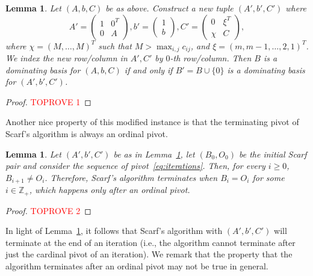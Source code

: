 \documentclass[11pt]{article}
\newtheorem{lemma}[theorem]{Lemma}
\begin{document}
\begin{lemma}\label{lem:0-Row-Column}
Let $(A,b,C)$ be as above. Construct a new tuple $(A',b',C')$ where 
\begin{equation}\label{eq:0-Row-Column}
    A'=\left(\begin{matrix}
        1 & 0^T \\
        0 & A
    \end{matrix}\right),
    b'=\left(\begin{matrix}
        1  \\
        b
    \end{matrix}\right),
    C'=\left(\begin{matrix}
        0 & \xi^T \\
        \chi & C
    \end{matrix}\right),
\end{equation}
where $\chi=(M,\dots,M)^T$ such that $M>\max_{i,j}c_{ij}$, and $\xi=(m,m-1,\dots,2,1)^T$. We index the new row/column in $A',C'$ by $0$-th row/column.
Then $B$ is a dominating basis for $(A,b,C)$ if and only if $B'=B\cup\{0\}$ is a dominating basis for $(A',b',C')$. 

\end{lemma}

\begin{proof}\textcolor{red}{TOPROVE 1}\end{proof}



Another nice property of this modified instance is that the terminating pivot of Scarf's algorithm is always an ordinal pivot.

\begin{lemma}\label{lem:last-ordinal}
    Let $(A',b',C')$ be as in Lemma~\ref{lem:0-Row-Column}, let $(B_0,O_0)$ be the initial Scarf pair and consider the sequence of pivot~\eqref{eq:iterations}. Then, for every $i\ge 0$, $B_{i+1}\neq O_i$. Therefore, Scarf's algorithm terminates when $B_i=O_i$ for some $i\in\mathbb{Z}_+$, which happens only after an ordinal pivot.
\end{lemma}

\begin{proof}\textcolor{red}{TOPROVE 2}\end{proof}

In light of Lemma~\ref{lem:last-ordinal}, it follows that Scarf's algorithm with $(A',b',C')$ will terminate at the end of an iteration (i.e., the algorithm cannot terminate after just the cardinal pivot of an iteration). We remark that the property that the algorithm terminates after an ordinal pivot may not be true in general.
\end{document}
